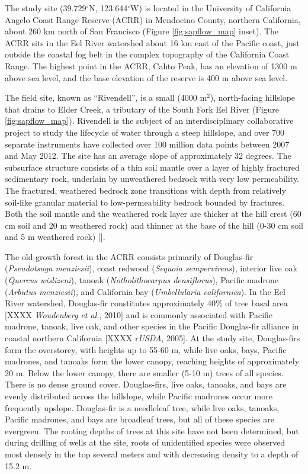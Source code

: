 The study site (39.729$^{\circ}$N, 123.644$^{\circ}$W) is located in the University of California Angelo Coast Range Reserve (ACRR) in Mendocino County, northern California, about 260 km north of San Francisco (Figure \ref{fig:sapflow_map} inset).  The ACRR sits in the Eel River watershed about 16 km east of the Pacific coast, just outside the coastal fog belt in the complex topography of the California Coast Range. The highest point in the ACRR, Cahto Peak, has an elevation of 1300 m above sea level, and the base elevation of the reserve is 400 m above sea level.
	
The field site, known as ``Rivendell'', is a small (4000 m$^2$), north-facing hillslope that drains to Elder Creek, a tributary of the South Fork Eel River (Figure \ref{fig:sapflow_map}).  Rivendell is the subject of an interdisciplinary collaborative project to study the lifecycle of water through a steep hillslope, and over 700 separate instruments have collected over 100 million data points between 2007 and May 2012.  The site has an average slope of approximately 32 degrees.  The subsurface structure consists of a thin soil mantle over a layer of highly fractured sedimentary rock, underlain by unweathered bedrock with very low permeability.  The fractured, weathered bedrock zone transitions with depth from relatively soil-like granular material to low-permeability bedrock bounded by fractures.  Both the soil mantle and the weathered rock layer are thicker at the hill crest (60 cm soil and 20 m weathered rock) and thinner at the base of the hill (0-30 cm soil and 5 m weathered rock) [\cite{rempe2010}].

The old-growth forest in the ACRR consists primarily of Douglas-fir (\textit{Pseudotsuga menziesii}), coast redwood (\textit{Sequoia sempervirens}), interior live oak (\textit{Quercus wislizeni}), tanoak (\textit{Notholithocarpus densiflorus}), Pacific madrone (\textit{Arbutus menziesii}), and California bay (\textit{Umbellularia californica}).  In the Eel River watershed, Douglas-fir constitutes approximately 40\% of tree basal area [XXXX \textit{Woudenberg et al.}, 2010] and is commonly associated with Pacific madrone, tanoak, live oak, and other species in the Pacific Douglas-fir alliance in coastal northern California [XXXX r\textit{USDA}, 2005].  At the study site, Douglas-firs form the overstorey, with heights up to 55-60 m, while live oaks, bays, Pacific madrones, and tanoaks form the lower canopy, reaching heights of approximately 20 m.  Below the lower canopy, there are smaller (5-10 m) trees of all species. There is no dense ground cover. Douglas-firs, live oaks, tanoaks, and bays are evenly distributed across the hillslope, while Pacific madrones occur more frequently upslope.  Douglas-fir is a needleleaf tree, while live oaks, tanoaks, Pacific madrones, and bays are broadleaf trees, but all of these species are evergreen. The rooting depths of trees at this site have not been determined, but during drilling of wells at the site, roots of unidentified species were observed most densely in the top several meters and with decreasing density to a depth of 15.2 m.

